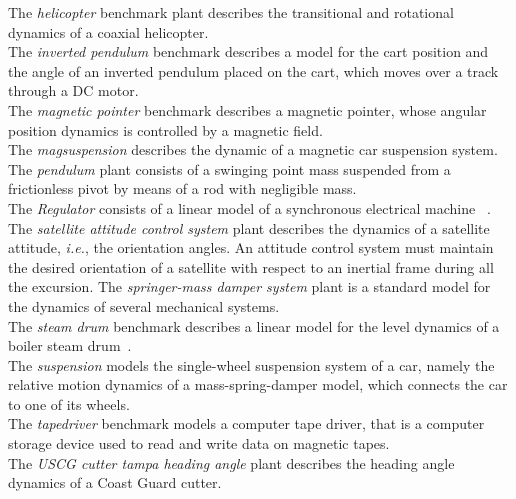 The \textit{helicopter} benchmark plant  describes the transitional and rotational dynamics 
of a coaxial helicopter. \\ 
%
The \textit{inverted pendulum} benchmark  
describes a model for the cart position and the angle of an inverted pendulum placed on the cart,  
which moves over a track through a DC motor. \\ 
%
The \textit{magnetic pointer} benchmark  describes a magnetic pointer, 
whose angular position dynamics is controlled by a magnetic field. \\ 
%
The \textit{magsuspension} describes  the dynamic of a magnetic car suspension system. \\
The \textit{pendulum}  plant consists of a swinging point mass suspended from a frictionless pivot by means of a rod with negligible mass.  \\ 
%
The \textit{Regulator} consists of a linear model of a synchronous electrical machine%
~\cite{KOKOTOVIC198023}. \\
The \textit{satellite attitude control system} plant describes the dynamics of a satellite 
attitude, {\it i.e.}, the orientation angles. An attitude control system must maintain the desired 
orientation of a satellite with respect to an 
inertial frame during all the excursion. 
The \textit{springer-mass damper system} plant is a standard model for the dynamics of several mechanical systems. \\ 
The \textit{steam drum} benchmark describes a linear model for the level dynamics of a boiler steam drum~\cite{boiler}. \\ 
%
The \textit{suspension} models the single-wheel suspension system of a car, 
namely the relative motion dynamics of a mass-spring-damper model, which connects the car to one of its wheels.  \\
The \textit{tapedriver} benchmark models a computer tape driver, 
that is a computer storage device used to read and write data on magnetic tapes. \\ 
The \textit{USCG cutter tampa heading angle} plant describes the heading angle dynamics of a Coast 
Guard cutter. 

